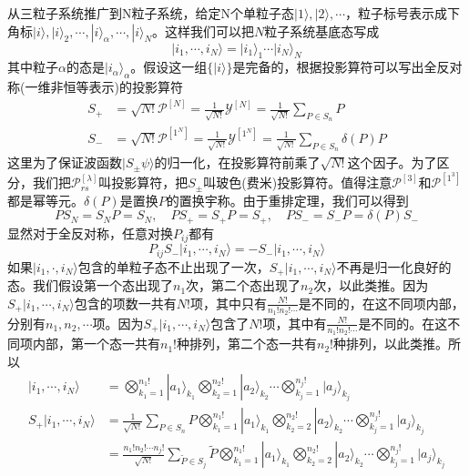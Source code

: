\documentclass[12pt]{article}
\begin{document}
从三粒子系统推广到N粒子系统，给定N个单粒子态$|1\rangle,|2\rangle,\cdots$，粒子标号表示成下角标$|i\rangle,|i\rangle_2,\cdots,|i\rangle_\alpha,\cdots,|i\rangle_N$。这样我们可以把$N$粒子系统基底态写成
\begin{equation*}
    |i_1,\cdots,i_N\rangle=|i_1\rangle_1\cdots|i_N\rangle_N
\end{equation*}
其中粒子$\alpha$的态是$|i_\alpha\rangle_\alpha$。假设这一组$\{|i\rangle\}$是完备的，根据投影算符可以写出全反对称(一维非恒等表示)的投影算符
\begin{equation*}
    \begin{split}
        S_{+}&=\sqrt{N!}\mathcal{P}^{[N]}=\frac{1}{\sqrt{N!}}\mathcal{Y}^{[N]}=\frac{1}{\sqrt{N!}}\sum_{P\in S_n}P\\
        S_{-}&=\sqrt{N!}\mathcal{P}^{[1^N]}=\frac{1}{\sqrt{N!}}\mathcal{Y}^{[1^N]}=\frac{1}{\sqrt{N!}}\sum_{P\in S_n}\delta(P)P
    \end{split}
\end{equation*}
这里为了保证波函数$|S_{\pm}\psi\rangle$的归一化，在投影算符前乘了$\sqrt{N!}$这个因子。为了区分，我们把$\mathcal{P}_{rs}^{[\lambda]}$叫投影算符，把$S_{\pm}$叫玻色(费米)投影算符。值得注意$\mathcal{P}^{[3]}$和$\mathcal{P}^{[1^3]}$都是幂等元。$\delta(P)$是置换$P$的置换宇称。由于重排定理，我们可以得到
\begin{equation*}
    PS_N=S_NP=S_N,\quad PS_+=S_+P=S_+,\quad PS_-=S_-P=\delta(P)S_-
\end{equation*}
显然对于全反对称，任意对换$P_{ij}$都有
\begin{equation*}
    P_{ij}S_-|i_1,\cdots,i_N\rangle=-S_-|i_1,\cdots,i_N\rangle
\end{equation*}
如果$|i_1,\cdot,i_N\rangle$包含的单粒子态不止出现了一次，$S_+|i_1,\cdots,i_N\rangle$不再是归一化良好的态。我们假设第一个态出现了$n_1$次，第二个态出现了$n_2$次，以此类推。因为$S_+|i_1,\cdots,i_N\rangle$包含的项数一共有$N!$项，其中只有$\frac{N!}{n_1!n_2!\cdots}$是不同的，在这不同项内部，分别有$n_1,n_2,\cdots$项。因为$S_+|i_1,\cdots,i_N\rangle$包含了$N!$项，其中有$\frac{N!}{n_1!n_2!\cdots}$是不同的。在这不同项内部，第一个态一共有$n_1!$种排列，第二个态一共有$n_2!$种排列，以此类推。所以
\begin{equation*}
    \begin{split}
        |i_1,\cdots,i_N\rangle&=\bigotimes_{k_1=1}^{n_1!}|a_1\rangle_{k_1}\bigotimes_{k_2=1}^{n_2!}|a_2\rangle_{k_2}\cdots\bigotimes_{k_j=1}^{n_j!}|a_j\rangle_{k_j}\\
        S_+|i_1,\cdots,i_N\rangle&=\frac{1}{\sqrt{N!}}\sum_{P\in S_n}P\bigotimes_{k_1=1}^{n_1!}|a_1\rangle_{k_1}\bigotimes_{k_2=2}^{n_2!}|a_2\rangle_{k_2}\cdots\bigotimes_{k_j=1}^{n_j!}|a_j\rangle_{k_j}\\
        &=\frac{n_1!n_2!\cdots n_j!}{\sqrt{N!}}\sum_{\tilde{P}\in S_j}\tilde{P}\bigotimes_{k_1=1}^{n_1!}|a_1\rangle_{k_1}\bigotimes_{k_2=2}^{n_2!}|a_2\rangle_{k_2}\cdots\bigotimes_{k_j=1}^{n_j!}|a_j\rangle_{k_j}
    \end{split}
\end{equation*}
\end{document}
